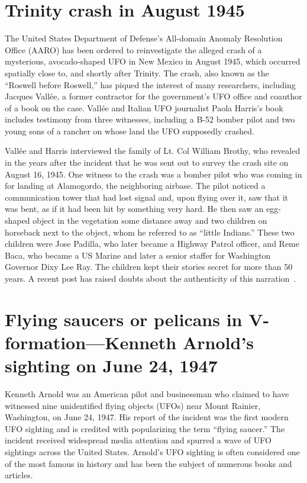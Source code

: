 \section{Trinity crash in August 1945}\label{2023-UFO-part-History-chapter-post-1945-pre-1953.tex-tc1945}

The United States Department of Defense's All-domain Anomaly Resolution Office (AARO)
has been ordered to reinvestigate the alleged crash of a mysterious,
avocado-shaped UFO in New Mexico in August 1945, which occurred spatially close to, and shortly after Trinity.
The crash, also known as the ``Roswell before Roswell,''
has piqued the interest of many researchers, including Jacques Vall\'ee,
a former contractor for the government's UFO office and coauthor of a book on the case.
Vall\'ee and Italian UFO journalist Paola Harris's book~\cite{Vallee2021May} includes testimony from three witnesses,
including a B-52 bomber pilot and two young sons of a rancher on whose land the UFO supposedly crashed.

Vall\'ee and Harris interviewed the family of Lt. Col William Brothy,
who revealed in the years after the incident that he was sent out to survey the crash site on August 16, 1945. One witness to the crash was a bomber pilot who was coming in for landing at Alamogordo, the neighboring airbase. The pilot noticed a communication tower that had lost signal and, upon flying over it, saw that it was bent, as if it had been hit by something very hard. He then saw an egg-shaped object in the vegetation some distance away and two children on horseback next to the object, whom he referred to as ``little Indians.'' These two children were Jose Padilla, who later became a Highway Patrol officer, and Reme Baca, who became a US Marine and later a senior staffer for Washington Governor Dixy Lee Ray. The children kept their stories secret for more than 50 years.
A recent post has raised doubts about the authenticity of this narration~\cite{Johnson2023May,Clarkson2023May}.

\section{Flying saucers or pelicans in V-formation---Kenneth Arnold's sighting on June 24, 1947}

\label{2023-UFO-part-History-chapter-post-1945-pre-1947-KA}

Kenneth Arnold was an American pilot and businessman who claimed to have witnessed nine unidentified flying objects (UFOs) near Mount Rainier, Washington, on June 24, 1947. His report of the incident was the first modern UFO sighting and is credited with popularizing the term ``flying saucer.'' The incident received widespread media attention and spurred a wave of UFO sightings across the United States. Arnold's UFO sighting is often considered one of the most famous in history and has been the subject of numerous books and articles.

